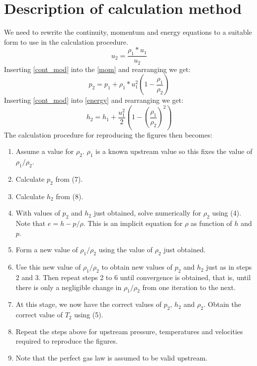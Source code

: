 \documentclass[9pt]{article}
\begin{document}
\section*{Description of calculation method}
\noindent We need to rewrite the continuity, momentum and energy equations to a suitable form to use in the calculation procedure.
\begin{equation}
\label{cont_mod}
u_{2}=\frac{\rho_{1}*u_{1}}{u_{2}}
\end{equation}
Inserting \eqref{cont_mod} into the \eqref{mom} and rearranging we get:
\begin{equation}
p_{2}=p_{1}+\rho_{1}*u_{1}^{2}(1-\frac{\rho_{1}}{\rho_{2}})
\end{equation}
Inserting \eqref{cont_mod} into \eqref{energy} and rearranging we get:
\begin{equation}
h_{2}=h_{1}+\frac{u_{1}^{2}}{2}(1-(\frac{\rho_{1}}{\rho_{2}})^{2})
\end{equation}
\noindent The calculation procedure for reproducing the figures then becomes:
\begin{enumerate}
\item Assume a value for $\rho_2$. $\rho_1$ is a known upstream value so this fixes the value of $\rho_{1}/\rho_{2}$.
\item Calculate $p_2$ from (7).
\item Calculate $h_2$ from (8).
\item With values of $p_2$ and $h_2$ just obtained, solve numerically for $\rho_2$ using (4). Note that $e=h-p/\rho$. This is an implicit equation for $\rho$ as function of $h$ and $p$.
\item Form a new value of $\rho_{1}/\rho_{2}$ using the value of $\rho_2$ just obtained.
\item Use this new value of $\rho_{1}/\rho_{2}$ to obtain new values of $p_2$ and $h_2$ just as in steps 2 and 3. Then repeat steps 2 to 6 until convergence is obtained, that is, until there is only a negligible change in $\rho_{1}/\rho_{2}$ from one iteration to the next.
\item At this stage, we now have the correct values of $p_2$, $h_2$ and $\rho_2$. Obtain the correct value of $T_2$ using (5).
\item Repeat the steps above for upstream pressure, temperatures and velocities required to reproduce the figures.
\item Note that the perfect gas law is assumed to be valid upstream.
\end{enumerate}
\end{document}

